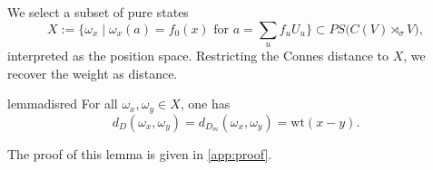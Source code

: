 \documentclass[12pt]{article}
\theoremstyle{definition} %
\theoremstyle{plain} %
\theoremstyle{remark} %
\theoremstyle{underline}
\begin{document}
We select a subset of pure states
\[
    X := \{\omega_x \mid \omega_x(a)=f_0(x) \text{ for } a=\sum_u f_uU_u\}
    \subset PS\bigl(C(V)\rtimes_\sigma V\bigr),
\]
interpreted as the position space. Restricting the Connes distance to $X$, we recover the weight as distance.

\begin{restatable}{lemma}{disred}
    \label{lem:distance-reduction}
    For all $\omega_x,\omega_y\in X$, one has
    \[
        d_D(\omega_x,\omega_y)=d_{D_m}(\omega_x,\omega_y)=\mathrm{wt}(x-y).
    \]
\end{restatable}

The proof of this lemma is given in \ref{app:proof}.




\end{document}
